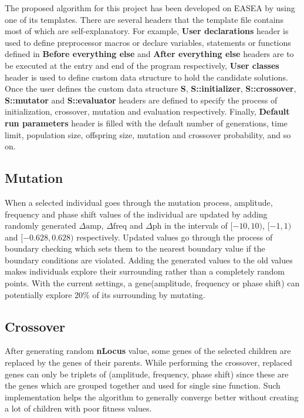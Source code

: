 \documentclass[conference]{IEEEtran}
\begin{document}
The proposed algorithm for this project has been developed on EASEA by using one of its templates. There are several headers that the template file contains most of which are self-explanatory. For example, 
\textbf{User declarations} header is used to define preprocessor macros or declare variables, statements or functions defined in \textbf{Before everything else} and \textbf{After everything else} headers 
are to be executed at the entry and end of the program respectively, \textbf{User classes} header is used to define custom data structure to hold the candidate solutions. Once the user defines the custom 
data structure \textbf{S}, \textbf{S::initializer}, \textbf{S::crossover}, \textbf{S::mutator} and \textbf{S::evaluator} headers are defined to specify the process of initialization, crossover, mutation and 
evaluation respectively. Finally, \textbf{Default run parameters} header is filled with the default number of generations, time limit, population size, offspring size, mutation and crossover probability, 
and so on.

\subsection{Mutation}
When a selected individual goes through the mutation process, amplitude, frequency and phase shift values of the individual are updated by adding randomly generated $\Delta \text{amp}$, 
$\Delta \text{freq}$ and $\Delta \text{ph}$ in the intervals of $[-10,10)$, $[-1,1)$ and $[-0.628,0.628)$ respectively. Updated values go through the process of boundary checking which sets 
them to the nearest boundary value if the boundary conditions are violated. Adding the generated values to the old values makes individuals explore their surrounding rather than a completely 
random points. With the current settings, a gene(amplitude, frequency or phase shift) can potentially explore 20\% of its surrounding by mutating.

\subsection{Crossover}
After generating random \textbf{nLocus} value, some genes of the selected children are replaced by the genes of their parents. While performing the crossover, replaced genes can only be triplets of (amplitude, 
frequency, phase shift) since these are the genes which are grouped together and used for single sine function. Such implementation helps the algorithm to generally converge better without creating a lot of 
children with poor fitness values.
\end{document}
